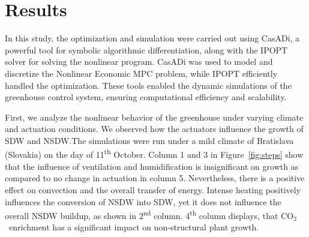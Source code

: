\documentclass[conference]{IEEEtran}
\newcommand{\coo}{\ensuremath{\mathrm{CO_2}}}
\begin{document}
\section{Results}
In this study, the optimization and simulation were carried out using CasADi\cite{Andersson2019}, a powerful tool for symbolic algorithmic differentiation, along with the IPOPT solver\cite{Wachter2006} for solving the nonlinear program. CasADi was used to model and discretize the Nonlinear Economic MPC problem, while IPOPT efficiently handled the optimization. These tools enabled the dynamic simulations of the greenhouse control system, ensuring computational efficiency and scalability.

First, we analyze the nonlinear behavior of the greenhouse under varying climate and actuation conditions. We observed how the actuators influence the growth of SDW and NSDW.\@ The simulations were run under a mild climate of Bratislava (Slovakia) on the day of 11\textsuperscript{th} October. Column 1 and 3 in Figure~\ref{fig:steps} show that the influence of ventilation and humidification is insignificant on growth as compared to no change in actuation in column 5.
Nevertheless, there is a positive effect on convection and the overall transfer of energy. Intense heating positively influences the conversion of NSDW into SDW, yet it does not influence the overall NSDW buildup, as shown in 2\textsuperscript{nd} column. 4\textsuperscript{th} column displays, that \coo\ enrichment has a significant impact on non-structural plant growth.
\end{document}
